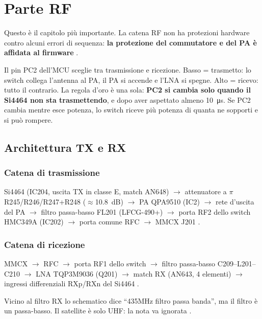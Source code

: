 \chapter{Parte RF}
\label{ch:rf}

Questo è il capitolo più importante. La catena RF non ha protezioni hardware contro alcuni errori di sequenza: \textbf{la protezione del commutatore e del PA è affidata al firmware} .

\begin{semplice}
Il pin PC2 dell'MCU sceglie tra trasmissione e ricezione. Basso = trasmetto: lo switch collega l'antenna al PA, il PA si accende e l'LNA si spegne. Alto = ricevo: tutto il contrario. La regola d'oro è una sola: \textbf{PC2 si cambia solo quando il Si4464 non sta trasmettendo}, e dopo aver aspettato almeno \SI{10}{\micro\second}. Se PC2 cambia mentre esce potenza, lo switch riceve più potenza di quanta ne sopporti e si può rompere.
\end{semplice}

\section{Architettura TX e RX}
\label{sec:rf-arch}

\subsection{Catena di trasmissione}
Si4464 (IC204, uscita TX in classe E, match AN648) $\to$ attenuatore a $\pi$ R245/R246/R247+R248 ($\approx$\SI{10.8}{dB}) $\to$ PA QPA9510 (IC2) $\to$ rete d'uscita del PA $\to$ filtro passa-basso FL201 (LFCG-490+) $\to$ porta RF2 dello switch HMC349A (IC202) $\to$ porta comune RFC $\to$ MMCX J201 .

\subsection{Catena di ricezione}
MMCX $\to$ RFC $\to$ porta RF1 dello switch $\to$ filtro passa-basso C209--L201--C210 $\to$ LNA TQP3M9036 (Q201) $\to$ match RX (AN643, 4 elementi) $\to$ ingressi differenziali RXp/RXn del Si4464 .

\begin{nota}
Vicino al filtro RX lo schematico dice \enquote{435MHz filtro passa banda}, ma il filtro è un passa-basso. Il satellite è solo UHF: la nota va ignorata .
\end{nota}

